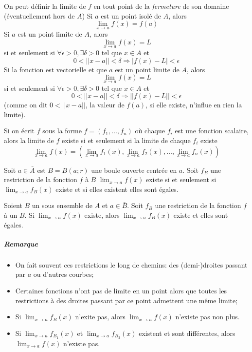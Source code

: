 \begin{mydef}
	On peut définir la limite de $f$ en tout point de la \emph{fermeture} de son domaine (éventuellement hors de $A$)
	Si $a$ est un point isolé de $A$, alors
	\[ \lim_{x \to a} f(x) = f(a) \]
	Si $a$ est un point limite de $A$, alors
	\[ \lim_{x \to a} f(x) = L \]
	si et seulement si $\forall \epsilon >0, \exists \delta > 0$ tel que $x \in A$ et
	\[ 0 < || x - a || < \delta \Rightarrow |f(x) - L| < \epsilon \]
	Si la fonction est vectorielle et que $a$ est un point limite de $A$, alors
	\[ \lim_{x \to a} f(x) = L \]
	si et seulement si $\forall \epsilon >0, \exists \delta > 0$ tel que $x \in A$ et
	\[ 0 < || x - a || < \delta \Rightarrow ||f(x) - L|| < \epsilon \]
	(comme on dit $0 < ||x - a||$, la valeur de $f(a)$, si elle existe, n'influe en rien la limite).

	Si on écrit $f$ sous la forme $f = (f_1 , \dots , f_n)$ où chaque $f_i$ est une fonction scalaire, alors la limite de $f$ existe si et seulement si la limite de chaque $f_i$ existe
	\[ \lim_{x \to a} f(x) = \left( \lim_{x \to a} f_1(x), \lim_{x \to a} f_2(x), \dots , \lim_{x \to a} f_n(x) \right) \]
\end{mydef}

\begin{myprop}
	Soit $a \in \bar{A}$ est $B = B(a; r)$ une boule ouverte centrée en $a$.
	Soit $f_B$ une restriction de la fonction $f$ à $B$
	\( \lim_{x \to a}f(x) \)
	existe si et seulement si
	\( \lim_{x \to a}f_B(x) \)
	existe et si elles existent elles sont égales.
\end{myprop}

\begin{myprop}
	\label{prop:path}
	Soient $B$ un sous ensemble de $A$ et $a \in \bar{B}$.
	Soit $f_B$ une restriction de la fonction $f$ à un $B$.
	Si
	\( \lim_{x \to a}f(x) \)
	existe, alors
	\( \lim_{x \to a}f_B(x) \)
	existe et elles sont égales.
	\subparagraph{Remarque}
	\begin{itemize}
		\item On fait souvent ces restrictions le long de chemins: des (demi-)droites passant par $a$ ou d'autres courbes;
		\item Certaines fonctions n'ont pas de limite en un point alors que toutes les restrictions à des droites passant par
			ce point admettent une même limite;
		\item Si $\lim_{x \to a}f_B(x)$ n'exite pas, alors $\lim_{x \to a} f(x)$ n'existe pas non plus.
		\item Si $\lim_{x \to a}f_{B_1}(x)$ et $\lim_{x \to a}f_{B_2}(x)$ existent et sont différentes, alors
			$\lim_{x \to a} f(x)$ n'existe pas.
	\end{itemize}
\end{myprop}

